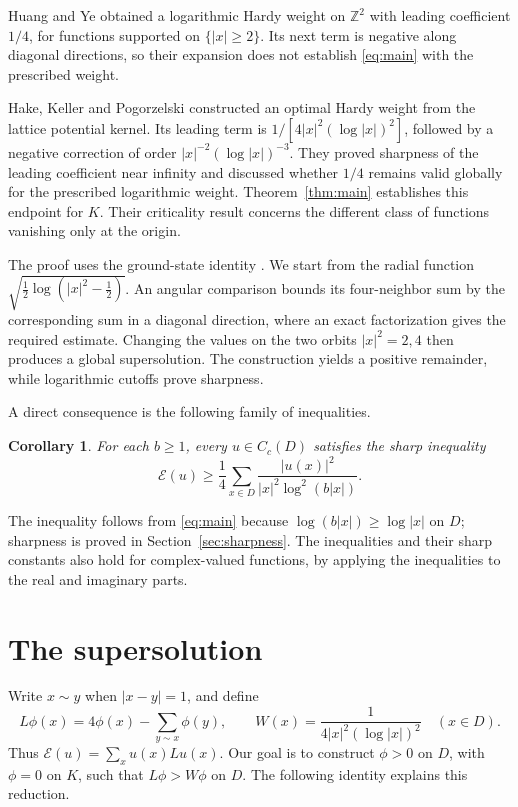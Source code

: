 \documentclass[11pt]{amsart}
\newtheorem{corollary}[theorem]{Corollary}
\numberwithin{equation}{section}
\newcommand{\Z}{\mathbb Z}
\newcommand{\E}{\mathcal E}
\newcommand{\Cc}{C_c}
\begin{document}
Huang and Ye \cite[Remark 6.2]{HY} obtained a logarithmic Hardy weight
on $\Z^2$ with leading coefficient $1/4$, for functions supported on
$\{|x|\ge2\}$. Its next term is negative along diagonal directions,
so their expansion does not establish \eqref{eq:main} with the
prescribed weight.

Hake, Keller and Pogorzelski \cite[Corollary 2 and the subsequent
remark]{HKP} constructed an optimal Hardy weight from the lattice
potential kernel. Its leading term is
$1/[4|x|^2(\log|x|)^2]$, followed by a negative correction of order
$|x|^{-2}(\log|x|)^{-3}$. They proved sharpness of the leading coefficient
near infinity and discussed whether $1/4$ remains valid globally for the
prescribed logarithmic weight. Theorem~\ref{thm:main} establishes this
endpoint for $K$. Their criticality result concerns the different class
of functions vanishing only at the origin.

The proof uses the ground-state identity
\cite{KPP}. We start from the radial function
$\sqrt{\frac12\log(|x|^2-\frac12)}$.
An angular comparison bounds its four-neighbor sum by the corresponding
sum in a diagonal direction, where an exact factorization gives the
required estimate. Changing the values on the two orbits $|x|^2=2,4$
then produces a global supersolution. The construction yields a positive
remainder, while logarithmic cutoffs prove sharpness.

A direct consequence is the following family of inequalities.

\begin{corollary}\label{cor:shift}
For each $b\ge1$, every $u\in\Cc(D)$ satisfies the sharp inequality
\begin{equation}\label{eq:shift}
\E(u)\ge\frac14\sum_{x\in D}
\frac{|u(x)|^2}{|x|^2\log^2(b|x|)}.
\end{equation}
\end{corollary}

The inequality follows from \eqref{eq:main} because
$\log(b|x|)\ge\log|x|$ on $D$; sharpness is proved in
Section~\ref{sec:sharpness}. The inequalities and their sharp constants
also hold for complex-valued functions, by applying the inequalities
to the real and imaginary parts.

\section{The supersolution}\label{sec:super}

Write $x\sim y$ when $|x-y|=1$, and define
\[
L\phi(x)=4\phi(x)-\sum_{y\sim x}\phi(y),
\qquad
W(x)=\frac1{4|x|^2(\log|x|)^2}\quad(x\in D).
\]
Thus $\E(u)=\sum_xu(x)Lu(x)$. Our goal is to construct $\phi>0$ on
$D$, with $\phi=0$ on $K$, such that $L\phi>W\phi$ on $D$.
The following identity explains this reduction.
\end{document}
